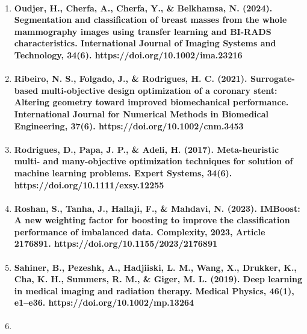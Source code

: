 \begin{enumerate}
  \paragraph{Nhut, T. H., Trung, V. P., Khoi, C. M., Tuan, N. K., Tin, H. N. P., Hieu, N. T., Danh, P. H., \& Cuong, C. M. (2025). An AIoT-based system for efficient classification of rice leaf diseases. IEEJ Transactions on Electrical and Electronic Engineering, 20(11), 1875–1881. https://doi.org/10.1002/tee.70163}
\item
  \paragraph{Oudjer, H., Cherfa, A., Cherfa, Y., \& Belkhamsa, N. (2024). Segmentation and classification of breast masses from the whole mammography images using transfer learning and BI-RADS characteristics. International Journal of Imaging Systems and Technology, 34(6). https://doi.org/10.1002/ima.23216}
\item
  \paragraph{Ribeiro, N. S., Folgado, J., \& Rodrigues, H. C. (2021). Surrogate-based multi-objective design optimization of a coronary stent: Altering geometry toward improved biomechanical performance. International Journal for Numerical Methods in Biomedical Engineering, 37(6). https://doi.org/10.1002/cnm.3453}
\item
  \paragraph{Rodrigues, D., Papa, J. P., \& Adeli, H. (2017). Meta-heuristic multi- and many-objective optimization techniques for solution of machine learning problems. Expert Systems, 34(6). https://doi.org/10.1111/exsy.12255}
\item
  \paragraph{Roshan, S., Tanha, J., Hallaji, F., \& Mahdavi, N. (2023). IMBoost: A new weighting factor for boosting to improve the classification performance of imbalanced data. Complexity, 2023, Article 2176891. https://doi.org/10.1155/2023/2176891}
\item
  \paragraph{Sahiner, B., Pezeshk, A., Hadjiiski, L. M., Wang, X., Drukker, K., Cha, K. H., Summers, R. M., \& Giger, M. L. (2019). Deep learning in medical imaging and radiation therapy. Medical Physics, 46(1), e1–e36. https://doi.org/10.1002/mp.13264}
\item

\end{enumerate}
